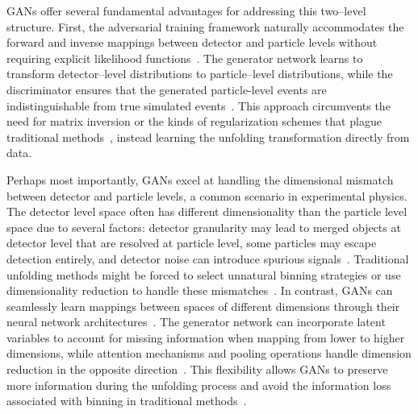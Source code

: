                 GANs offer several fundamental advantages for addressing this two--level structure.
                First, the adversarial training framework naturally accommodates the forward and inverse mappings between detector and particle levels without requiring explicit likelihood functions~\cite{datta_unfolding_2018, hashemi_deep_2024, bellagente_how_2020}.
                The generator network learns to transform detector--level distributions to particle--level distributions, while the discriminator ensures that the generated particle-level events are indistinguishable from true simulated events~\cite{erdmann_generating_2018}.
                This approach circumvents the need for matrix inversion or the kinds of regularization schemes that plague traditional methods~\cite{Girosi1995RegularizationArchitectures, Santos2022AvoidingNetworks}, instead learning the unfolding transformation directly from data.
                
                Perhaps most importantly, GANs excel at handling the dimensional mismatch between detector and particle levels, a common scenario in experimental physics.
                The detector level space often has different dimensionality than the particle level space due to several factors: detector granularity may lead to merged objects at detector level that are resolved at particle level, some particles may escape detection entirely, and detector noise can introduce spurious signals~\cite{komiske_preserving_2021, andreassen_omnifold_2020}.
                Traditional unfolding methods might be forced to select unnatural binning strategies or use dimensionality reduction to handle these mismatches~\cite{schmitt_tunfold_2012}.
                In contrast, GANs can seamlessly learn mappings between spaces of different dimensions through their neural network architectures~\cite{bellagente_how_2020}.
                The generator network can incorporate latent variables to account for missing information when mapping from lower to higher dimensions, while attention mechanisms and pooling operations handle dimension reduction in the opposite direction~\cite{datta_unfolding_2018, erdmann_precise_2019}. This flexibility allows GANs to preserve more information during the unfolding process and avoid the information loss associated with binning in traditional methods~\cite{andreassen_omnifold_2020}.
        

